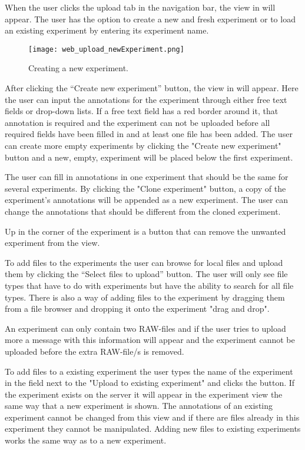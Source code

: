 When the user clicks the upload tab in the navigation bar, the view in  will appear. The user has the option to create a new and fresh experiment or to load an existing experiment by entering its experiment name. 
\begin{figure}[h]
\centering
\texttt{[image: web\_upload\_newExperiment.png]}
\caption{\label{fig:web_upload_newExperiment}Creating a new experiment.}
\end{figure}

After clicking the “Create new experiment” button, the view in  will appear. Here the user can input the annotations for the experiment through either free text fields or drop-down lists. If a free text field has a red border around it, that annotation is required and the experiment can not be uploaded before all required fields have been filled in and at least one file has been added.
The user can create more empty experiments by clicking the "Create new experiment" button and a new, empty, experiment will be placed below the first experiment.

The user can fill in annotations in one experiment that should be the same for several experiments. By clicking the "Clone experiment" button, a copy of the experiment's annotations will be appended as a new experiment. The user can change the annotations that should be different from the cloned experiment.

Up in the corner of the experiment is a button that can remove the unwanted experiment from the view. 

To add files to the experiments the user can browse for local files and upload them by clicking the “Select files to upload” button. The user will only see file types that have to do with experiments but have the ability to search for all file types. There is also a way of adding files to the experiment by dragging them from a file browser and dropping it onto the experiment "drag and drop".

An experiment can only contain two RAW-files and if the user tries to upload more a message with this information will appear and the experiment cannot be uploaded before the extra RAW-file/s is removed. 

To add files to a existing experiment the user types the name of the experiment in the field next to the "Upload to existing experiment" and clicks the button. If the experiment exists on the server it will appear in the experiment view the same way that a new experiment is shown. The annotations of an existing experiment cannot be changed from this view and if there are files already in this experiment they cannot be manipulated. Adding new files to existing experiments works the same way as to a new experiment.

